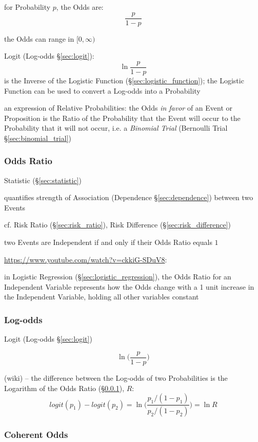 for Probability $p$, the Odds are:
\[
  \frac{p}{1-p}
\]

the Odds can range in $[0, \infty)$

\fist Logit (Log-odds \S\ref{sec:logit}):
\[
  \ln \frac{p}{1-p}
\]
is the Inverse of the Logistic Function (\S\ref{sec:logistic_function}); the
Logistic Function can be used to convert a Log-odds into a Probability

an expression of Relative Probabilities: the Odds \emph{in favor} of an Event or
Proposition is the Ratio of the Probability that the Event will occur to the
Probability that it will not occur, i.e. a \emph{Binomial Trial}
(Bernoulli Trial \S\ref{sec:binomial_trial})



\subsubsection{Odds Ratio}\label{sec:odds_ratio}

Statistic (\S\ref{sec:statistic})

quantifies strength of Association (Dependence \S\ref{sec:dependence}) between
two Events

\fist cf. Risk Ratio (\S\ref{sec:risk_ratio}), Risk Difference
(\S\ref{sec:risk_difference})

two Events are Independent if and only if their Odds Ratio equals $1$

\url{https://www.youtube.com/watch?v=ckkiG-SDuV8}:

in Logistic Regression (\S\ref{sec:logistic_regression}), the Odds Ratio for an
Independent Variable represents how the Odds change with a 1 unit increase in
the Independent Variable, holding all other variables constant



\subsubsection{Log-odds}\label{sec:log_odds}

Logit (Log-odds \S\ref{sec:logit})

\[
  \ln \Big(\frac{p}{1 - p}\Big)
\]

(wiki) --
the difference between the Log-odds of two Probabilities is the Logarithm
of the Odds Ratio (\S\ref{sec:odds_ratio}), $R$:
\[
  logit(p_1) - logit(p_2) = \ln\Big(\frac{p_1/(1 - p_1)}{p_2/(1 - p_2)}\Big)
    = \ln R
\]



\subsubsection{Coherent Odds}\label{sec:coherent_odds}


